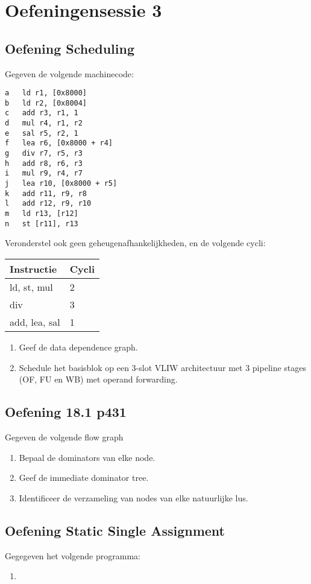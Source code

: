 \chapter{Oefeningensessie 3}


\section{Oefening Scheduling}

Gegeven de volgende machinecode:
\begin{lstlisting}
a	ld r1, [0x8000]
b	ld r2, [0x8004]
c	add r3, r1, 1
d	mul r4, r1, r2
e	sal r5, r2, 1
f	lea r6, [0x8000 + r4]
g	div r7, r5, r3
h	add r8, r6, r3
i	mul	r9, r4, r7
j	lea r10, [0x8000 + r5]
k	add r11, r9, r8
l	add r12, r9, r10
m	ld r13, [r12]
n	st [r11], r13
\end{lstlisting}
Veronderstel ook geen geheugenafhankelijkheden, en de volgende cycli:
\begin{table}
	\begin{tabular}{| l | l |}
		\hline 
		\textbf{Instructie} & \textbf{Cycli} \\
		\hline
		ld, st, mul & 2 \\
		div & 3 \\
		add, lea, sal & 1
	\end{tabular}
\end{table}

\begin{enumerate}
	\item Geef de data dependence graph.
	\item Schedule het basisblok op een 3-slot VLIW architectuur met 3 pipeline stages (OF, FU en WB) met operand forwarding.
	
\end{enumerate}

\section{Oefening 18.1 p431}
Gegeven de volgende flow graph

\begin{enumerate}
	\item Bepaal de dominators van elke node.
	\item Geef de immediate dominator tree.
	\item Identificeer de verzameling van nodes van elke natuurlijke lus.
\end{enumerate}

\section{Oefening Static Single Assignment}
Gegegeven het volgende programma:




\begin{enumerate}
	\item 
\end{enumerate}